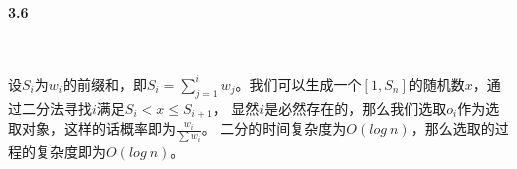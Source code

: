 \paragraph{3.6}~{}

设$S_i$为$w_i$的前缀和，即$S_i = \sum_{j=1}^i w_j$。我们可以生成一个$[1,S_n]$的随机数$x$，通过二分法寻找$i$满足$S_i < x \le S_{i+1}$，
显然$i$是必然存在的，那么我们选取$o_i$作为选取对象，这样的话概率即为$\frac{w_i}{\sum w_i}$。
二分的时间复杂度为$O(log \: n)$，那么选取的过程的复杂度即为$O(log \: n)$。